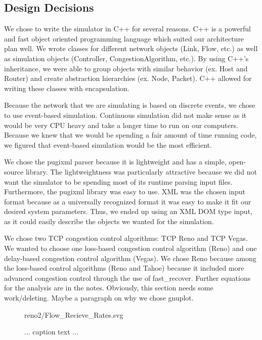 \documentclass{article}
\begin{document}
\subsection{Design Decisions}
    We chose to write the simulator in C++ for several reasons. C++ is a powerful and fast object oriented programming language which suited our architecture plan well. We wrote classes for different network objects (Link, Flow, etc.) as well as simulation objects (Controller, CongestionAlgorithm, etc.). By using C++’s inheritance, we were able to group objects with similar behavior (ex. Host and Router) and create abstraction hierarchies (ex. Node, Packet).  C++ allowed for writing these classes with encapsulation.

    Because the network that we are simulating is based on discrete events, we chose to use event-based simulation. Continuous simulation did not make sense as it would be very CPU heavy and take a longer time to run on our computers. Because we knew that we would be spending a fair amount of time running code, we figured that event-based simulation would be the most efficient.

    We chose the pugixml parser because it is lightweight and has a simple, open-source library. The lightweightness was particularly attractive because we did not want the simulator to be spending most of its runtime parsing input files. Furthermore, the pugixml library was easy to use. XML was the chosen input format because as a universally recognized format it was easy to make it fit our desired system parameters. Thus, we ended up using an XML DOM type input, as it could easily describe the objects we wanted for the simulation.

    We chose two TCP congestion control algorithms: TCP Reno and TCP Vegas. We wanted to choose one loss-based congestion control algorithm (Reno) and one delay-based congestion control algorithm (Vegas). We chose Reno because among the loss-based control algorithms (Reno and Tahoe) because it included more advanced congestion control through the use of fast\_recover. Further equations for the analysis are in the notes. Obviously, this section needs some work/deleting.
    Maybe a paragraph on why we chose gnuplot.


\begin{figure}[htbp]
    \centering
    
    {reno2/Flow_Recieve_Rates.svg}
    \caption{ ... caption text ... }
\end{figure}
\begin{comment}
/Flow_Outstanding_Packets.svg
/Flow_Recieve_Rates.svg
/Flow_RTT.svg
/Flow_Send_Rates.svg
/Flow_Window.svg
/Host_Receive.svg
/Host_Send.svg
/Link_Flow_Rate.svg
/Link_Occupancy.svg
/Link_Packet_Loss.svg
/Vegas_Diff.svg
\end{comment}











\end{document}
